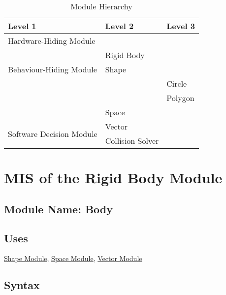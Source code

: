 \documentclass[12pt]{article}
\newcommand{\Shape}{\hyperref[MISShape]{Shape Module}}
\newcommand{\Space}{\hyperref[MISSpace]{Space Module}}
\newcommand{\Vector}{\hyperref[MISVector]{Vector Module}}
\newcommand{\Transform}{\hyperref[MISTransform]{Transform Matrix Module}}
\newcommand{\SpatialIndex}{\hyperref[MISSpatial]{Spatial Index Module}}
\newcommand{\Sequence}{\hyperref[MISSequence]{Sequence Data Structure Module}}
\begin{document}
\begin{table}[h!]
\centering
\begin{tabular}{p{} p{} p{}}
\toprule
\textbf{Level 1} & \textbf{Level 2}  & \textbf{Level 3} \\
\midrule
		
		
{Hardware-Hiding Module} & ~ \\
\midrule
		
\multirow{3}{0.3\textwidth}{Behaviour-Hiding Module}
& Rigid Body\\
& Shape\\
& &Circle \\
& &Polygon \\
& Space\\ 
\midrule
		
\multirow{3}{0.3\textwidth}{Software Decision Module} 
& Vector\\ 
&Collision Solver \\  
		
\bottomrule
		
		
		
	\end{tabular}
	
	\caption{Module Hierarchy}
	
	\label{TblMH}
	
\end{table}


\section{MIS of the Rigid Body Module} \label{MISBody}

\subsection{Module Name: Body} 

\subsection{Uses} \label{SecUBody}
	\Shape, \Space, \Vector %
	
\subsection{Syntax}
\end{document}
